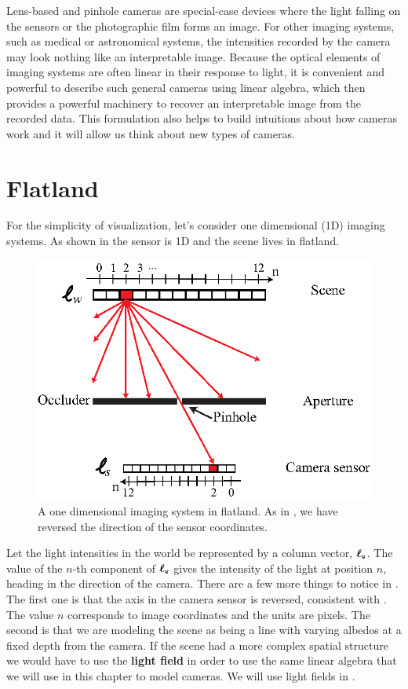 Lens-based and pinhole cameras are special-case devices where the
light falling on the sensors or the photographic film forms an image.
For other imaging systems, such as medical or astronomical systems, the intensities recorded by the camera may look
nothing like an interpretable image.  Because the optical elements of imaging systems are often linear in their response to light, it is convenient and powerful to describe such general cameras using linear algebra, which then provides a powerful machinery to recover an interpretable image from the recorded data. This formulation also helps to build intuitions about how cameras work and it will allow us think about new types of cameras.


\section{Flatland}

For the simplicity of visualization, let's consider one dimensional (1D)
imaging systems.  As shown in \fig{\ref{fig:flatland_camera_linear}} the sensor is
1D and the scene lives in flatland. 

\begin{figure}
\centerline{
\includegraphics[width=.5\linewidth]{figures/imaging/flatland_camera_linear.eps}
}
\caption{A one dimensional imaging system in flatland. As in \fig{\ref{fig:pinholeGeometry}}, we have reversed the direction of the sensor coordinates.}
\label{fig:flatland_camera_linear}
\end{figure}


Let the light
intensities in the
world be represented by a column vector, $\boldsymbol\ell_{\texttt{w}}$.  The value of the $n$-th
component of $\boldsymbol\ell_{\texttt{w}}$ gives the intensity of the light at position $n$, heading in the direction of the camera.  There are a few more things to notice in \fig{\ref{fig:flatland_camera_linear}}. The first one is that the axis in the camera sensor is reversed, consistent with \fig{\ref{fig:pinholeGeometry}}. The value $n$ corresponds to image coordinates and the units are pixels. The second is that we are modeling the scene as being a line with varying albedos at a fixed depth from the camera. If the scene had a more complex spatial structure we would have to use the {\bf light field} in order to use the same linear algebra that we will use in this chapter to model cameras. We will use light fields in \chap{\ref{chapter:nerfs}}.

